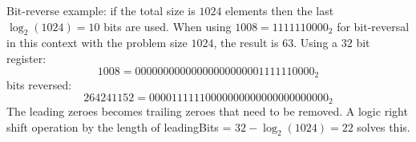 Bit-reverse example: if the total size is $1024$ elements then the last $\log_{2}(1024) = 10$ bits are used. When using $1008 = 1111110000_{2}$ for bit-reversal in this context with the problem size $1024$, the result is $63$. Using a $32$ bit register:
\begin{equation}
	1008 = 00000000000000000000001111110000_{2}
\end{equation}
bits reversed:
\begin{equation}
	264241152 = 00001111110000000000000000000000_{2} 
\end{equation}
The leading zeroes becomes trailing zeroes that need to be removed. A logic right shift operation by the length of leadingBits = $32 - \log_{2}(1024) = 22$ solves this.
